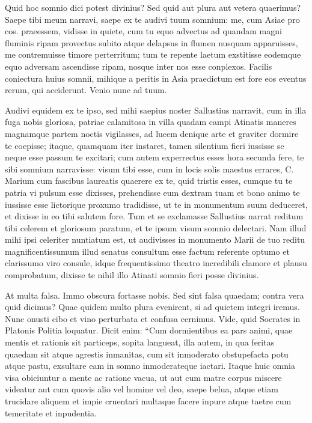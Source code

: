  Quid hoc somnio dici potest divinius? Sed quid aut plura aut vetera quaerimus? Saepe tibi meum narravi, saepe ex te audivi tuum somnium: me, cum Asiae pro cos. praeessem, vidisse in quiete, cum tu equo advectus ad quandam magni fluminis ripam provectus subito atque delapsus in flumen nusquam apparuisses, me contremuisse timore perterritum; tum te repente laetum exstitisse eodemque equo adversam ascendisse ripam, nosque inter nos esse conplexos. Facilis coniectura huius somnii, mihique a peritis in Asia praedictum est fore eos eventus rerum, qui acciderunt. Venio nunc ad tuum.

 Audivi equidem ex te ipso, sed mihi saepius noster Sallustius narravit, cum in illa fuga nobis gloriosa, patriae calamitosa in villa quadam campi Atinatis maneres magnamque partem noctis vigilasses, ad lucem denique arte et graviter dormire te coepisse; itaque, quamquam iter instaret, tamen silentium fieri iussisse se neque esse passum te excitari; cum autem experrectus esses hora secunda fere, te sibi somnium narravisse: visum tibi esse, cum in locis solis maestus errares, C. Marium cum fascibus laureatis quaerere ex te, quid tristis esses, cumque tu te patria vi pulsum esse dixisses, prehendisse eum dextram tuam et bono animo te iussisse esse lictorique proxumo tradidisse, ut te in monumentum suum deduceret, et dixisse in eo tibi salutem fore. Tum et se exclamasse Sallustius narrat reditum tibi celerem et gloriosum paratum, et te ipsum visum somnio delectari. Nam illud mihi ipsi celeriter nuntiatum est, ut audivisses in monumento Marii de tuo reditu magnificentissumum illud senatus consultum esse factum referente optumo et clarissumo viro consule, idque frequentissimo theatro incredibili clamore et plausu comprobatum, dixisse te nihil illo Atinati somnio fieri posse divinius.

 At multa falsa. Immo obscura fortasse nobis. Sed sint falsa quaedam; contra vera quid dicimus? Quae quidem multo plura evenirent, si ad quietem integri iremus. Nunc onusti cibo et vino perturbata et confusa cernimus. Vide, quid Socrates in Platonis Politia loquatur. Dicit enim: ``Cum dormientibus ea pars animi, quae mentis et rationis sit particeps, sopita langueat, illa autem, in qua feritas quaedam sit atque agrestis inmanitas, cum sit inmoderato obstupefacta potu atque pastu, exsultare eam in somno inmoderateque iactari. Itaque huic omnia visa obiciuntur a mente ac ratione vacua, ut aut cum matre corpus miscere videatur aut cum quovis alio vel homine vel deo, saepe belua, atque etiam trucidare aliquem et impie cruentari multaque facere inpure atque taetre cum temeritate et inpudentia.

